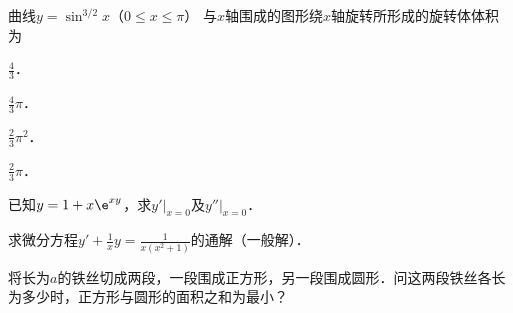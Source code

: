 \documentclass[plain,noanswer,medmath]{../../template/jnuexam}
\begin{document}


\begin{problem}
曲线$y=\sin^{3/2} x$（$0\le x\le \pi$）
与$x$轴围成的图形绕$x$轴旋转所形成的旋转体体积为\pickout{}
\begin{abcd}
\item $\frac{4}{3}$．          
\item $\frac{4}{3}\pi$．         
\item $\frac{2}{3}\pi^2$．      
\item $\frac{2}{3}\pi$．
\end{abcd}
\end{problem}








\begin{problem}
已知$y=1+x\e^{xy}$，求$y'|_{x=0}$及$y''|_{x=0}$．
\end{problem}


\begin{problem}
求微分方程$y'+\frac{1}{x}y=\frac{1}{x(x^2+1)}$的通解（一般解）．
\end{problem}






\begin{problem}
将长为$a$的铁丝切成两段，一段围成正方形，另一段围成圆形．问这两段铁丝各长为多少时，正方形与圆形的面积之和为最小？
\end{problem}
\end{document}
